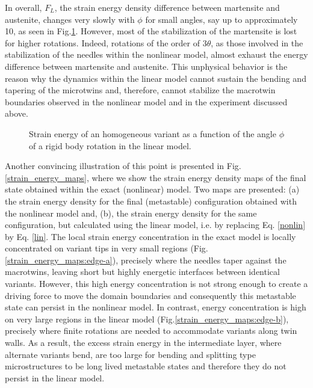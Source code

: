 \documentclass[twocolumn,amsmath,amssymb]{revtex4}
\begin{document}
%
In overall, $F_L$, the strain energy density difference between  martensite and  austenite, changes very slowly with $\phi $ for small angles, say up to approximately 10\degree, as seen in Fig.\ref{strain_energy:edge-a}. However, most of the stabilization of the martensite is lost for higher rotations. Indeed, rotations of the order of $3\theta$, as those involved in the stabilization of the needles within the nonlinear model, almost exhaust the energy difference between martensite and austenite. This unphysical behavior  is the reason why the dynamics within the linear model cannot sustain the bending and tapering of the microtwins and, therefore, cannot stabilize the macrotwin boundaries observed in the nonlinear model and in the experiment discussed above.
%
%
\begin{figure}
\begin{center}
\caption{\label{strain_energy:edge-a} Strain energy of an homogeneous variant as a function of the angle $\phi$ of a rigid body rotation in the linear model.  }
\end{center}
\end{figure}
%
Another convincing illustration of this point is presented in Fig. \ref{strain_energy_maps}, where we show the strain energy density maps of the final state obtained within the exact (nonlinear) model. Two maps are presented: (a) the strain energy density  for the final (metastable) configuration obtained with the nonlinear model and, (b), the strain energy density for the same configuration, but calculated using the linear model, i.e. by replacing Eq. \ref{nonlin} by Eq. \ref{lin}. The local strain energy concentration in the exact model is locally concentrated on variant tips in very small regions (Fig.\ref{strain_energy_maps:edge-a}), precisely where the needles taper against the macrotwins, leaving short but highly energetic interfaces between identical variants. However, this high energy concentration is not strong enough to create a driving force to move the domain boundaries and consequently this metastable state can persist in the nonlinear model.  In contrast, energy concentration is high on very large regions in the linear model (Fig.\ref{strain_energy_maps:edge-b}), precisely where finite rotations are needed to accommodate variants along twin walls. As a result, the excess strain energy in the intermediate layer, where alternate variants bend, are too large for bending and splitting type microstructures to be long lived metastable states and therefore they do not persist in the linear model. 
\end{document}
